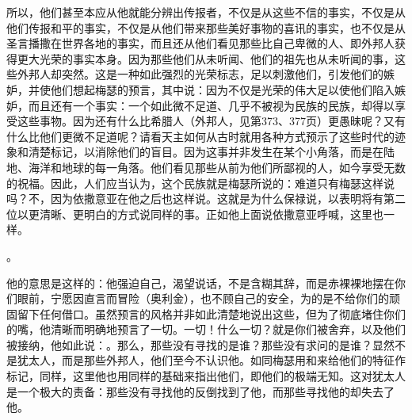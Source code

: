\newline{}\par

所以，他们甚至本应从他就能分辨出传报者，不仅是从这些不信的事实，不仅是从他们传报和平的事实，不仅是从他们带来那些美好事物的喜讯的事实，也不仅是从圣言播撒在世界各地的事实，而且还从他们看见那些比自己卑微的人、即外邦人获得更大光荣的事实本身。因为那些他们从未听闻、他们的祖先也从未听闻的事，这些外邦人却突然。这是一种如此强烈的光荣标志，足以刺激他们，引发他们的嫉妒，并使他们想起梅瑟的预言，其中说：因为不仅是光荣的伟大足以使他们陷入嫉妒，而且还有一个事实：一个如此微不足道、几乎不被视为民族的民族，却得以享受这些事物。因为还有什么比希腊人（外邦人，见第373、377页）更愚昧呢？又有什么比他们更微不足道呢？请看天主如何从古时就用各种方式预示了这些时代的迹象和清楚标记，以消除他们的盲目。因为这事并非发生在某个小角落，而是在陆地、海洋和地球的每一角落。他们看见那些从前为他们所鄙视的人，如今享受无数的祝福。因此，人们应当认为，这个民族就是梅瑟所说的：难道只有梅瑟这样说吗？不，因为依撒意亚在他之后也这样说。这就是为什么保禄说，以表明将有第二位以更清晰、更明白的方式说同样的事。正如他上面说依撒意亚呼喊，这里也一样。\par

\newline{}。\par

他的意思是这样的：他强迫自己，渴望说话，不是含糊其辞，而是赤裸裸地摆在你们眼前，宁愿因直言而冒险（奥利金），也不顾自己的安全，为的是不给你们的顽固留下任何借口。虽然预言的风格并非如此清楚地说出这些，但为了彻底堵住你们的嘴，他清晰而明确地预言了一切。一切！什么一切？就是你们被舍弃，以及他们被接纳，他如此说：\newline{}。那么，那些没有寻找的是谁？那些没有求问的是谁？显然不是犹太人，而是那些外邦人，他们至今不认识他。如同梅瑟用和来给他们的特征作标记，同样，这里他也用同样的基础来指出他们，即他们的极端无知。这对犹太人是一个极大的责备：那些没有寻找他的反倒找到了他，而那些寻找他的却失去了他。\par

